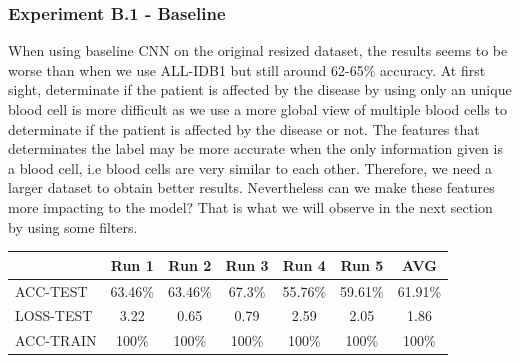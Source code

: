 \documentclass[11pt, openany]{report}
\theoremstyle{plain}
\theoremstyle{definition}
\theoremstyle{remark}
\begin{document}
\subsubsection{Experiment B.1 - Baseline}
When using baseline CNN on the original resized dataset, the results seems to be worse than when we use ALL-IDB1 but still around 62-65\% accuracy. At first sight, determinate if the patient is affected by the disease by using only an unique blood cell is more difficult as we use a more global view of multiple blood cells to determinate if the patient is affected by the disease or not. The features that determinates the label may be more accurate when the only information given is a blood cell, i.e blood cells are very similar to each other. Therefore, we need a larger dataset to obtain better results. Nevertheless can we make these features more impacting to the model? That is what we will observe in the next section by using some filters.  

\begin{center}
\begin{tabular}{|l|c|c|c|c|c|c|}
  \hline
   & \textbf{Run 1} & \textbf{Run 2} & \textbf{Run 3} & \textbf{Run 4} & \textbf{Run 5} & \textbf{AVG}\\
  \hline
  ACC-TEST & 63.46\% & 63.46\% & 67.3\% & 55.76\% & 59.61\% & 61.91\% \\
  LOSS-TEST & 3.22 & 0.65 & 0.79 & 2.59  & 2.05 & 1.86 \\ 
  ACC-TRAIN & 100\% & 100\% & 100\% & 100\% & 100\% & 100\% \\ 
  \hline
\end{tabular}
\label{table:results-B1}
\end{center}
\end{document}
